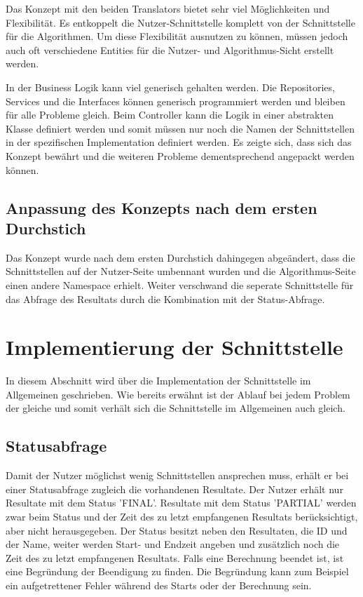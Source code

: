 Das Konzept mit den beiden Translators bietet sehr viel Möglichkeiten und Flexibilität. Es entkoppelt die Nutzer-Schnittstelle komplett von der Schnittstelle für die Algorithmen. Um diese 
Flexibilität ausnutzen zu können, müssen jedoch auch oft verschiedene Entities für die Nutzer- und Algorithmus-Sicht erstellt werden.

In der Business Logik kann viel generisch gehalten werden. Die Repositories, Services und die Interfaces können generisch programmiert werden und bleiben für alle Probleme gleich. Beim 
Controller kann die Logik in einer abstrakten Klasse definiert werden und somit müssen nur noch die Namen der Schnittstellen in der spezifischen Implementation definiert werden. Es zeigte sich, 
dass sich das Konzept bewährt und die weiteren Probleme dementsprechend angepackt werden können.

\subsection{Anpassung des Konzepts nach dem ersten Durchstich}\label{doings_prototyp}
Das Konzept wurde nach dem ersten Durchstich dahingegen abgeändert, dass die Schnittstellen auf der Nutzer-Seite umbennant wurden und die Algorithmus-Seite einen andere Namespace 
erhielt. Weiter verschwand die seperate Schnittstelle für das Abfrage des Resultats durch die Kombination mit der Status-Abfrage.

\section{Implementierung der Schnittstelle}\label{impl_interface}
In diesem Abschnitt wird über die Implementation der Schnittstelle im Allgemeinen geschrieben. Wie bereits erwähnt ist der Ablauf bei jedem Problem der gleiche und somit verhält sich die 
Schnittstelle im Allgemeinen auch gleich.

\subsection{Statusabfrage}
Damit der Nutzer möglichst wenig Schnittstellen ansprechen muss, erhält er bei einer Statusabfrage zugleich die vorhandenen Resultate. Der Nutzer erhält nur Resultate mit dem Status 'FINAL'. 
Resultate mit dem Status 'PARTIAL' werden zwar beim Status und der Zeit des zu letzt empfangenen Resultats berücksichtigt, aber nicht herausgegeben. Der Status besitzt neben den 
Resultaten, die ID und der Name, weiter werden Start- und Endzeit angeben und zusätzlich noch die Zeit des zu letzt empfangenen Resultats. Falls eine Berechnung beendet ist, ist eine 
Begründung der Beendigung zu finden. Die Begründung kann zum Beispiel ein aufgetrettener Fehler während des Starts oder der Berechnung sein.

